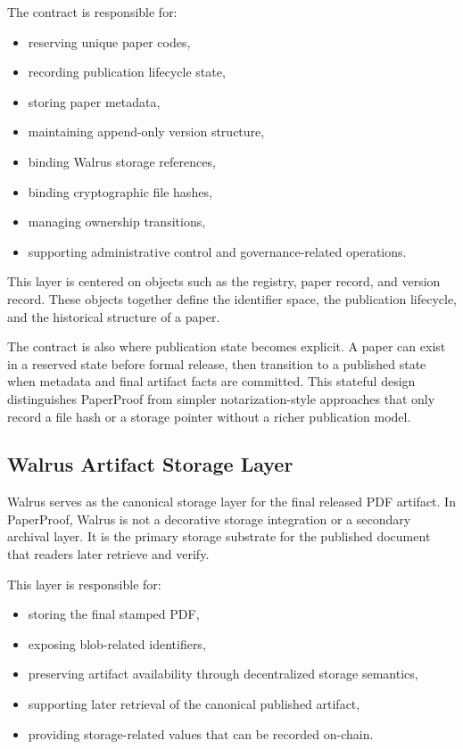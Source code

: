 \documentclass[journal]{IEEEtran}
\begin{document}
The contract is responsible for:
\begin{itemize}
    \item reserving unique paper codes,
    \item recording publication lifecycle state,
    \item storing paper metadata,
    \item maintaining append-only version structure,
    \item binding Walrus storage references,
    \item binding cryptographic file hashes,
    \item managing ownership transitions,
    \item supporting administrative control and governance-related operations.
\end{itemize}


This layer is centered on objects such as the registry, paper record, and version record. These objects together define the identifier space, the publication lifecycle, and the historical structure of a paper.

The contract is also where publication state becomes explicit. A paper can exist in a reserved state before formal release, then transition to a published state when metadata and final artifact facts are committed. This stateful design distinguishes PaperProof from simpler notarization-style approaches that only record a file hash or a storage pointer without a richer publication model.

\subsection{Walrus Artifact Storage Layer}

Walrus serves as the canonical storage layer for the final released PDF artifact. In PaperProof, Walrus is not a decorative storage integration or a secondary archival layer. It is the primary storage substrate for the published document that readers later retrieve and verify.

This layer is responsible for:
\begin{itemize}
    \item storing the final stamped PDF,
    \item exposing blob-related identifiers,
    \item preserving artifact availability through decentralized storage semantics,
    \item supporting later retrieval of the canonical published artifact,
    \item providing storage-related values that can be recorded on-chain.
\end{itemize}
\end{document}
